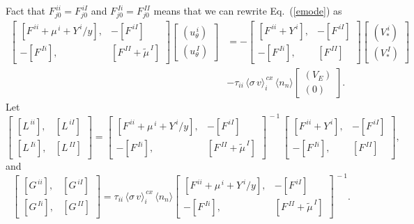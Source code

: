 \documentclass[12pt]{article}
\begin{document}
Fact that $F^{\,ii}_{j0} =F^{\,iI}_{j0}$ and $F^{\,Ii}_{j0}=F^{\,II}_{j0}$ means that we can rewrite Eq.~(\ref{emode}) as
\begin{align}
\left[\begin{array}{rr} [F^{\,ii}+\mu^{\,i}+Y^{\,i}/y], & -[F^{\,iI}]\\[0.5ex] -[F^{\,Ii}], & [F^{\,II}+\tilde{\mu}^{\,I}]\end{array}\right]
\left[\begin{array}{c}(u_\theta^{\,i}) \\[0.5ex] (u_\theta^{\,I})\end{array}\right]
&= -\left[\begin{array}{rr} [F^{\,ii}+Y^{\,i}], & -[F^{\,iI}]\\[0.5ex] -[F^{\,Ii}], & [F^{\,II}]\end{array}\right]
\left[\begin{array}{c} (V_\ast^{\,i})\\[0.5ex]
(V_\ast^{\,I})\end{array}\right]\nonumber\\[0.5ex]&-\tau_{ii}\,\langle\sigma\,v\rangle_i^{\,cx}\,\langle n_n\rangle\left[\begin{array}{c} (V_E)\\[0.5ex]
(0)\end{array}\right].
\end{align}
Let
\begin{equation}
\left[\begin{array}{rr} [L^{\,ii}], & [L^{\,iI}]\\[0.5ex] [L^{\,Ii}],& [L^{\,II}]\end{array}\right]=\left[\begin{array}{rr} [F^{\,ii}+\mu^{\,i}+Y^{\,i}/y], & -[F^{\,iI}]\\[0.5ex] -[F^{\,Ii}], & [F^{\,II}+\tilde{\mu}^{\,I}]\end{array}\right]^{\,-1}
\,
\left[\begin{array}{rr} [F^{\,ii}+Y^{\,i}], & -[F^{\,iI}]\\[0.5ex] -[F^{\,Ii}], & [F^{\,II}]\end{array}\right],
\end{equation}
and
\begin{equation}
\left[\begin{array}{rr} [G^{\,ii}], & [G^{\,iI}]\\[0.5ex] [G^{\,Ii}],& [G^{\,II}]\end{array}\right]=\tau_{ii}\,\langle\sigma\,v\rangle_i^{\,cx}\,\langle n_n\rangle\left[\begin{array}{rr} [F^{\,ii}+\mu^{\,i}+Y^{\,i}/y], & -[F^{\,iI}]\\[0.5ex] -[F^{\,Ii}], & [F^{\,II}+\tilde{\mu}^{\,I}]\end{array}\right]^{\,-1}.
\end{equation}
\end{document}
